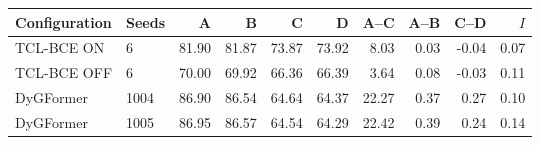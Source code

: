 \begin{tabular}{@{}llrrrrrrrr@{}}
\toprule
Configuration & Seeds & A & B & C & D & A--C & A--B & C--D & $I$\\
\midrule
TCL-BCE ON & 6 & 81.90 & 81.87 & 73.87 & 73.92 & 8.03 & 0.03 & -0.04 & 0.07\\
TCL-BCE OFF & 6 & 70.00 & 69.92 & 66.36 & 66.39 & 3.64 & 0.08 & -0.03 & 0.11\\
\midrule
DyGFormer & 1004 & 86.90 & 86.54 & 64.64 & 64.37 & 22.27 & 0.37 & 0.27 & 0.10\\
DyGFormer & 1005 & 86.95 & 86.57 & 64.54 & 64.29 & 22.42 & 0.39 & 0.24 & 0.14\\
\bottomrule
\end{tabular}
